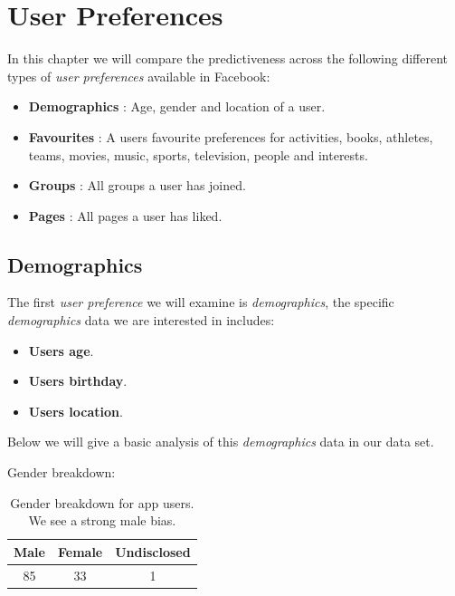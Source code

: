 
\chapter{User Preferences}
\label{cha:ivg}

In this chapter we will compare the predictiveness across the following different types of \emph{user preferences} available
in Facebook:
\begin{itemize}
\item \textbf{Demographics} : Age, gender and location of a user.
\item \textbf{Favourites} : A users favourite preferences for activities, books, athletes, teams, movies, music, sports, television, people and interests.
\item \textbf{Groups} : All groups a user has joined.
\item \textbf{Pages} :  All pages a user has liked.
\end{itemize}

\section{Demographics}
\label{sec:demo}

The first \emph{user preference} we will examine is \emph{demographics}, the specific \emph{demographics} data we are interested in includes:
\begin{itemize}
\item \textbf{Users age}.
\item \textbf{Users birthday}.
\item \textbf{Users location}.
\end{itemize}

Below we will give a basic analysis of this \emph{demographics} data in our data set.

Gender breakdown:

\begin{table}[!htbp]
\centering
	\begin{tabular}{|c|c|c|} %
		\hline
		\textbf{Male} & \textbf{Female} & \textbf{Undisclosed}  \\ \hline
		85 & 33 & 1 \\ \hline
	\end{tabular}
	\caption{Gender breakdown for app users. We see a strong male bias.}
	\label{tab:revpol}
\end{table}

